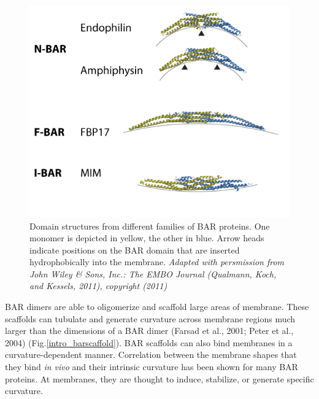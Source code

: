 \begin{figure}[H]
	\centering
	\includegraphics[scale=0.6]{figures/intro/BAR_structures}
		\caption[Structures of BAR domain dimers]{Domain structures from different families of BAR proteins. One monomer is depicted in yellow, the other in blue. Arrow heads indicate positions on the BAR domain that are inserted hydrophobically into the membrane. \textit{Adapted with persmission from John Wiley \& Sons, Inc.: The EMBO Journal (Qualmann, Koch, and Kessels, 2011), copyright (2011)}
		\label{bar_structures}}
\end{figure}

\vspace{5mm}
BAR dimers are able to oligomerize and scaffold large areas of membrane. These scaffolds can tubulate and generate curvature across membrane regions much larger than the dimensions of a BAR dimer (Farsad et al., 2001; Peter et al., 2004) (Fig.\ref{intro_barscaffold}). BAR scaffolds can also bind membranes in a curvature-dependent manner. Correlation between the membrane shapes that they bind \textit{in vivo} and their intrinsic curvature has been shown for many BAR proteins. At membranes, they are thought to induce, stabilize, or generate specific curvature. 



